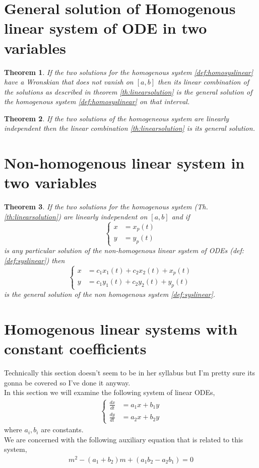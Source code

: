 \documentclass[oneside,11pt,pdftex,final]{book}%
\numberwithin{equation}{section}
\newtheorem{theorem}{Theorem}[chapter]%
\numberwithin{section}{chapter}
\numberwithin{equation}{chapter}
\begin{document}
\section{General solution of Homogenous linear system of ODE in two variables}

\begin{theorem}
	If the two solutions for the homogenous system \ref{def:homosyslinear} have a Wronskian that does not vanish on $ [a,b] $ then its linear combination of the solutions as described in theorem \ref{th:linearsolution} is the general solution of the homogenous system \ref{def:homosyslinear} on that interval.
\end{theorem}


\begin{theorem}
	If the two solutions of the homogeneous system are linearly independent then the linear combination \ref{th:linearsolution} is its general solution.
\end{theorem}


\section{Non-homogenous linear system in two variables}
\begin{theorem}
	If the two solutions for the homogenous system (Th. \ref{th:linearsolution}) are linearly independent on $ [a,b] $ and if 
	\[ \begin{cases}
		x&=x_p(t)\\
		y&=y_p(t)
	\end{cases} \]
	is any particular solution of the non-homogenous linear system of ODEs (def: \ref{def:syslinear}) then 
	\[ \begin{cases}
		x&=c_1x_1(t)+c_2x_2(t)+x_p(t)\\
		y&=c_1y_1(t)+c_2y_2(t)+y_p(t)
	\end{cases} \]
is the general solution of the non homogenous system \ref{def:syslinear}.
\end{theorem}

\section{Homogenous linear systems with constant coefficients}
Technically this section doesn't seem to be in her syllabus but I'm pretty sure its gonna be covered so I've done it anyway.\\
In this section we will examine the following system of linear ODEs,
\begin{align}\label{def:constanthomo}
	\begin{cases}
		\frac{dx}{dt}&=a_1x+b_1y\\
		\frac{dy}{dt}&=a_2x+b_2y
	\end{cases}
\end{align}
where $ a_i,b_i $ are constants.\\
We are concerned with the following auxiliary equation that is related to this system,
\begin{align}\label{def:sysaux}
	m^2-(a_1+b_2)m+(a_1b_2-a_2b_1)=0
\end{align}
\end{document}
